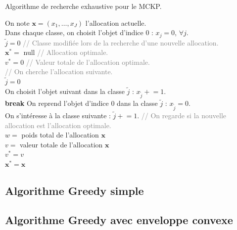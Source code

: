 \documentclass{article}
\newcommand{\pluseq}{\mathrel{+}=}
\newcommand\comm[1]{\footnotesize\ttfamily\textcolor{gray}{// #1}}
\begin{document}
\begin{algorithm}[!ht]
\caption{Algorithme de recherche exhaustive pour le MCKP.}
\label{alg:recherche-exhaustive}
\small
{}
On note $\mathbf{x} = (x_1, \dots, x_J)$ l'allocation actuelle.\\
Dans chaque classe, on choisit l'objet d'indice 0 : $x_j = 0$, $\forall j$.\\
$\tilde{j}=0$ \comm{Classe modifiée lors de la recherche d'une nouvelle allocation.}\\
$\mathbf{x}^{*} = $ null \comm{Allocation optimale.}\\
$v^{*} = 0$ \comm{Valeur totale de l'allocation optimale.}\\
{
	\comm{On cherche l'allocation suivante.}\\
	$\tilde{j} = 0$\\
	{
		{
			On choisit l'objet suivant dans la classe $\tilde{j}$ : $x_{\tilde{j}} \pluseq 1$.\\
			\textbf{break}
		}
		{
			On reprend l'objet d'indice 0 dans la classe $\tilde{j}$ : $x_{\tilde{j}} = 0$.\\
			On s'intéresse à la classe suivante : $\tilde{j} \pluseq 1$.
		}
	}
	\comm{On regarde si la nouvelle allocation est l'allocation optimale.}\\
	$w =$ poids total de l'allocation $\mathbf{x}$\\
	{
		$v =$ valeur totale de l'allocation $\mathbf{x}$\\
		{
			$v^{*} = v$\\
			$\mathbf{x}^{*} = \mathbf{x}$\\
		}
	}
}
\end{algorithm}

\subsection{Algorithme Greedy simple}

\subsection{Algorithme Greedy avec enveloppe convexe}
\end{document}
